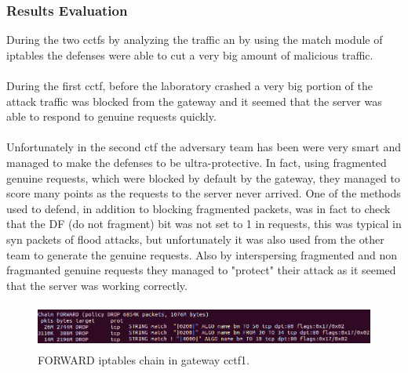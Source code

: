 \documentclass[14pt]{article}
\begin{document}
\subsubsection{Results Evaluation}
During the two cctfs by analyzing the traffic an by using the match module of iptables the defenses were able to cut a very big amount of malicious traffic. 
\\
\\
During the first cctf, before the laboratory crashed a very big portion of the attack traffic was blocked from the gateway and it seemed that the server was able to respond to genuine requests quickly.
\\
\\
Unfortunately in the second ctf the adversary team has been were very smart and managed to make the defenses to be ultra-protective. In fact, using fragmented genuine requests, which were blocked by default by the gateway, they managed to score many points as the requests to the server never arrived. One of the methods used to defend, in addition to blocking fragmented packets, was in fact to check that the DF (do not fragment) bit was not set to 1 in requests, this was typical in syn packets of flood attacks, but unfortunately it was also used from the other team to generate the genuine requests. Also by interspersing fragmented and non fragmanted genuine requests they managed to "protect" their attack as it seemed that the server was working correctly.

\begin{figure}[!h]
	\centering
	\includegraphics[width=20cm,height=1.5cm]{iptables_cctf_1}
	\caption{FORWARD iptables chain in gateway cctf1.}
\end{figure}
\end{document}
